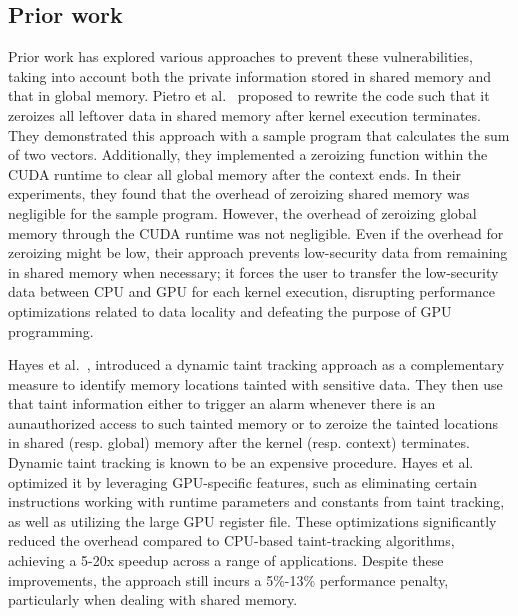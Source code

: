 \subsection{Prior work}
Prior work has explored various approaches to prevent these vulnerabilities, taking into account both the private information stored in shared memory and that in global memory.
%
Pietro et al.~\cite{pietro2016TECS} proposed to rewrite the code such that it zeroizes all leftover data in shared memory after kernel execution terminates.
%
They demonstrated this approach with a sample program that calculates the sum of two vectors.
%
Additionally, they implemented a zeroizing function within the CUDA runtime to clear all global memory after the context ends.
%
In their experiments, they found that the overhead of zeroizing shared memory was negligible for the sample program.
%
However, the overhead of zeroizing global memory through the CUDA runtime was not negligible.
%
Even if the overhead for zeroizing might be low, their approach prevents low-security data from remaining in shared memory when necessary; it forces the user to transfer the low-security data between CPU and GPU for each kernel execution, disrupting performance optimizations related to data locality and defeating the purpose of GPU programming.
%

%

%
Hayes et al.~\cite{hayes2017usenix}, introduced a dynamic taint tracking approach as a complementary measure to identify memory locations tainted with sensitive data.
%
They then use that taint information either to trigger an alarm whenever there is an aunauthorized access to such tainted memory or to zeroize the tainted locations in shared (resp. global) memory after the kernel (resp. context) terminates.
%
Dynamic taint tracking is known to be an expensive procedure. 
%
Hayes et al. optimized it by leveraging GPU-specific features, such as eliminating certain instructions working with runtime parameters and constants from taint tracking, as well as utilizing the large GPU register file.
%
These optimizations significantly reduced the overhead compared to CPU-based taint-tracking algorithms,  achieving a 5-20x speedup across a range of applications.
%
Despite these improvements, the approach still incurs a 5\%-13\% performance penalty, particularly when dealing with shared memory.

